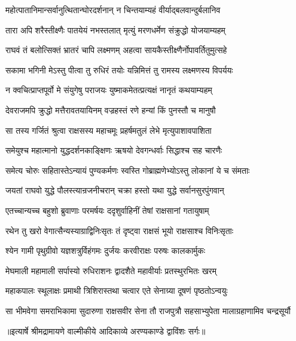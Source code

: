 \twolineshloka
{महोत्पातानिमान्सर्वानुत्थितान्घोरदर्शनान्}
{न चिन्तयाम्यहं वीर्याद्बलवान्दुर्बलानिव} %

\twolineshloka
{तारा अपि शरैस्तीक्ष्णैः पातयेयं नभस्तलात्}
{मृत्युं मरणधर्मेण संक्रुद्धो योजयाम्यहम्} %

\twolineshloka
{राघवं तं बलोत्सिक्तं भ्रातरं चापि लक्ष्मणम्}
{अहत्वा सायकैस्तीक्ष्णैर्नोपावर्तितुमुत्सहे} %

\twolineshloka
{सकामा भगिनी मेऽस्तु पीत्वा तु रुधिरं तयोः}
{यन्निमित्तं तु रामस्य लक्ष्मणस्य विपर्ययः} %

\twolineshloka
{न क्वचित्प्राप्तपूर्वो मे संयुगेषु पराजयः}
{युष्माकमेतत्प्रत्यक्षं नानृतं कथयाम्यहम्} %

\twolineshloka
{देवराजमपि क्रुद्धो मत्तैरावतयायिनम्}
{वज्रहस्तं रणे हन्यां किं पुनस्तौ च मानुषौ} %

\twolineshloka
{सा तस्य गर्जितं श्रुत्वा राक्षसस्य महाचमूः}
{प्रहर्षमतुलं लेभे मृत्युपाशावपाशिता} %

\twolineshloka
{समेयुश्च महात्मानो युद्धदर्शनकाङ्क्षिणः}
{ऋषयो देवगन्धर्वाः सिद्धाश्च सह चारणैः} %

\twolineshloka
{समेत्य चोरुः सहितास्तेऽन्यायं पुण्यकर्मणः}
{स्वस्ति गोब्राह्मणेभ्योऽस्तु लोकानां ये च संमताः} %

\twolineshloka
{जयतां राघवो युद्धे पौलस्त्यान्रजनीचरान्}
{चक्रा हस्तो यथा युद्धे सर्वानसुरपुंगवान्} %

\twolineshloka
{एतच्चान्यच्च बहुशो ब्रुवाणाः परमर्षयः}
{ददृशुर्वाहिनीं तेषां राक्षसानां गतायुषाम्} %

\twolineshloka
{रथेन तु खरो वेगात्सैन्यस्याग्राद्विनिःसृतः}
{तं दृष्ट्वा राक्षसं भूयो राक्षसाश्च विनिःसृताः} %

\twolineshloka
{श्येन गामी पृथुग्रीवो यज्ञशत्रुर्विहंगमः}
{दुर्जयः करवीराक्षः परुषः कालकार्मुकः} %

\twolineshloka
{मेघमाली महामाली सर्पास्यो रुधिराशनः}
{द्वादशैते महावीर्याः प्रतस्थुरभितः खरम्} %

\twolineshloka
{महाकपालः स्थूलाक्षः प्रमाथी त्रिशिरास्तथा}
{चत्वार एते सेनाग्र्या दूषणं पृष्ठतोऽन्वयुः} %

\fourlineindentedshloka
{सा भीमवेगा समराभिकामा}
{ सुदारुणा राक्षसवीर सेना}
{तौ राजपुत्रौ सहसाभ्युपेता}
{ मालाग्रहाणामिव चन्द्रसूर्यौ} %


{॥इत्यार्षे श्रीमद्रामायणे वाल्मीकीये आदिकाव्ये अरण्यकाण्डे द्वाविंशः सर्गः॥}

